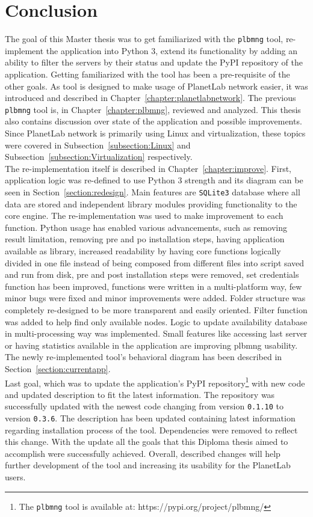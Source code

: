 \chapter{Conclusion}
The goal of this Master thesis was to get familiarized with the \texttt{plbmng} tool, re-implement the application into Python 3, extend its functionality by adding an ability to filter the servers by their status and update the PyPI repository of the application. Getting familiarized with the tool has been a pre-requisite of the other goals. As tool is designed to make usage of PlanetLab network easier, it was introduced and described in Chapter~\ref{chapter:planetlabnetwork}. The previous \texttt{plbmng} tool is, in Chapter~\ref{chapter:plbmng}, reviewed and analyzed. This thesis also contains discussion over state of the application and possible improvements. Since PlanetLab network is primarily using Linux and virtualization, these topics were covered in Subsection~\ref{subsection:Linux} and Subsection~\ref{subsection:Virtualization} respectively.\\
The re-implementation itself is described in Chapter~\ref{chapter:improve}. First, application logic was re-defined to use Python 3 strength and its diagram can be seen in Section~\ref{section:redesign}. Main features are \texttt{SQLite3} database where all data are stored and independent library modules providing functionality to the core engine. The re-implementation was used to make improvement to each function. Python usage has enabled various advancements, such as removing result limitation, removing pre and po installation steps, having application available as library, increased readability by having core functions logically divided in one file instead of being composed from different files into script saved and run from disk, pre and post installation steps were removed, set credentials function has been improved, functions were written in a multi-platform way, few minor bugs were fixed and minor improvements were added. Folder structure was completely re-designed to be more transparent and easily oriented. Filter function was added to help find only available nodes. Logic to update availability database in multi-processing way was implemented. Small features like accessing last server or having statistics available in the application are improving plbmng usability. The newly re-implemented tool's behavioral diagram has been described in Section~\ref{section:currentapp}.\\
Last goal, which was to update the application's PyPI repository\footnote{The \texttt{plbmng} tool is available at: https://pypi.org/project/plbmng/} with new code and updated description to fit the latest information. The repository was successfully updated with the newest code changing from version \texttt{0.1.10} to version \texttt{0.3.6}. The description has been updated containing latest information regarding installation process of the tool. Dependencies were removed to reflect this change. With the update all the goals that this Diploma thesis aimed to accomplish were successfully achieved. Overall, described changes will help further development of the tool and increasing its usability for the PlanetLab users.
